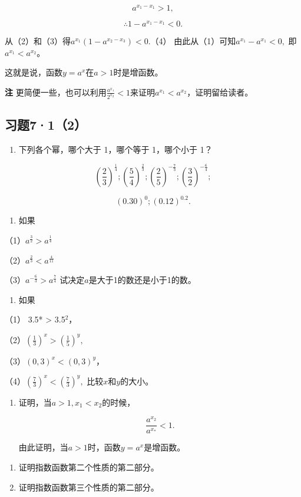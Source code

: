 \[
a^{x_{1} - x_{1}} > 1,
\]

\[
\therefore 1 - a^{x_{1} - x_{1}} < 0. \tag {3}
\]

从（2）和（3）得\(a^{x_1}(1 - a^{x_2 - x_3}) < 0.\)（4）
由此从（1）可知\(a^{x_1} - a^{x_1} < 0,\) 即\(a^{x_1} < a^{x_2}\)。

这就是说，函数\(y = a^x\)在\(a > 1\)时是增函数。

\textbf{注}
更简便一些，也可以利用\(\frac{a^{x_1}}{2^{x_2}} < 1\)来证明\(a^{x_1} < a^{x_2}\)，证明留给读者。

\subsection{习题7·1（2）}

\begin{enumerate}
\item
  下列各个幂，哪个大于 1，哪个等于 1，哪个小于 1？
\end{enumerate}

\[
\left(\frac{2}{3}\right)^{\frac{1}{4}}; \left(\frac{5}{4}\right)^{\frac{2}{3}}; \left(\frac{2}{5}\right)^{- \frac{7}{3}}; \left(\frac{3}{2}\right)^{- \frac{6}{4}};
\]

\[
(0.30)^{0}; (0.12)^{0.2}.
\]

\begin{enumerate}[start=2]
\item
  如果
\end{enumerate}

（1）\(a^{\frac{3}{2}} > a^{\frac{1}{4}}\)

（2）\(a^{\frac{2}{3}} < a^{\frac{4}{11}}\)

（3）\(a^{-\frac{6}{3}} > a^{\frac{7}{4}}\)
试决定\(a\)是大于1的数还是小于1的数。

\begin{enumerate}[start=3]
\item
  如果
\end{enumerate}

（1） 3.5* \textgreater{} 3.5\(^{2}\)，

（2）\(\left(\frac{1}{3}\right)^x > \left(\frac{1}{5}\right)^y,\)

（3）\((0,3)^{x} < (0,3)^{y}\)，

（4）\(\left(\frac{7}{3}\right)^x < \left(\frac{7}{3}\right)^y,\)
比较\(x\)和\(y\)的大小。

\begin{enumerate}[start=1,label={*\arabic*.}]
\item
  证明，当\(a > 1, x_1 < x_2\)的时候，

\[
\frac{a^{x_{2}}}{a^{x_{*}}} < 1.
\]

由此证明，当\(a > 1\)时，函数\(y = a^x\)是增函数。

\end{enumerate}
\begin{enumerate}[start=5,label={*\arabic*.}]
\item
  证明指数函数第二个性质的第二部分。

\item
  证明指数函数第三个性质的第二部分。

\end{enumerate}
